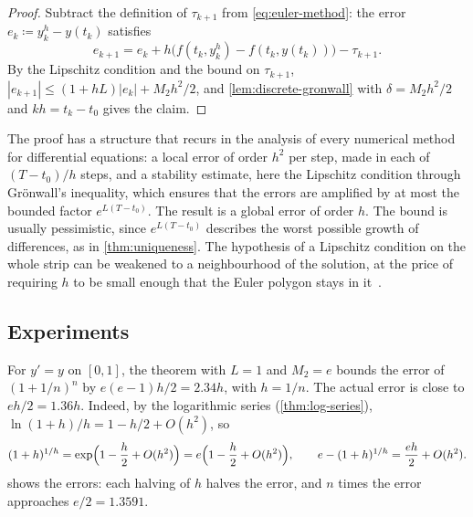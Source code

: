 \begin{proof}
Subtract the definition of $\tau_{k+1}$ from \eqref{eq:euler-method}: the error $e_k\coloneqq y_k^h-y(t_k)$ satisfies
\[
e_{k+1}=e_k+h\bigl(f(t_k,y_k^h)-f(t_k,y(t_k))\bigr)-\tau_{k+1} .
\]
By the Lipschitz condition and the bound on $\tau_{k+1}$, $|e_{k+1}|\le(1+hL)|e_k|+M_2h^2/2$, and \cref{lem:discrete-gronwall} with $\delta=M_2h^2/2$ and $kh=t_k-t_0$ gives the claim.
\end{proof}

The proof has a structure that recurs in the analysis of every numerical method for differential equations: a local error of order $h^2$ per step, made in each of $(T-t_0)/h$ steps, and a stability estimate, here the Lipschitz condition through Gr\"onwall's inequality, which ensures that the errors are amplified by at most the bounded factor $e^{L(T-t_0)}$. The result is a global error of order $h$. The bound is usually pessimistic, since $e^{L(T-t_0)}$ describes the worst possible growth of differences, as in \cref{thm:uniqueness}. The hypothesis of a Lipschitz condition on the whole strip can be weakened to a neighbourhood of the solution, at the price of requiring $h$ to be small enough that the Euler polygon stays in it~\cite[Chap.~II]{hairer1993}.

\subsection{Experiments}

For $y'=y$ on $[0,1]$, the theorem with $L=1$ and $M_2=e$ bounds the error of $(1+1/n)^n$ by $e(e-1)h/2=2.34h$, with $h=1/n$. The actual error is close to $eh/2=1.36h$. Indeed, by the logarithmic series (\cref{thm:log-series}), $\ln(1+h)/h=1-h/2+O(h^2)$, so
\[
(1+h)^{1/h}=\exp\Bigl(1-\frac h2+O(h^2)\Bigr)=e\Bigl(1-\frac h2+O(h^2)\Bigr),\qquad e-(1+h)^{1/h}=\frac{eh}2+O(h^2).
\]
 shows the errors: each halving of $h$ halves the error, and $n$ times the error approaches $e/2=1.3591$.

